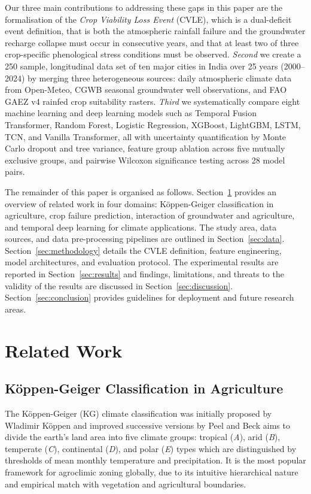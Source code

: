 \documentclass{ieeeaccess}
\begin{document}
Our three main contributions to addressing these gaps in this paper are the formalisation of the \textit{Crop Viability Loss Event} (CVLE), which is a dual-deficit event definition, that is both the atmospheric rainfall failure and the groundwater recharge collapse must occur in consecutive years, and that at least two of three crop-specific phenological stress conditions must be observed. \textit{Second} we create a 250 sample, longitudinal data set of ten major cities in India over 25 years (2000--2024) by merging three heterogeneous sources: daily atmospheric climate data from Open-Meteo, CGWB seasonal groundwater well observations, and FAO GAEZ v4 rainfed crop suitability rasters. \textit{Third} we systematically compare eight machine learning and deep learning models such as Temporal Fusion Transformer, Random Forest, Logistic Regression, XGBoost, LightGBM, LSTM, TCN, and Vanilla Transformer, all with uncertainty quantification by Monte Carlo dropout and tree variance, feature group ablation across five mutually exclusive groups, and pairwise Wilcoxon significance testing across 28 model pairs.

The remainder of this paper is organised as follows. Section~\ref{sec:related_work} provides an overview of related work in four domains: K\"{o}ppen-Geiger classification in agriculture, crop failure prediction, interaction of groundwater and agriculture, and temporal deep learning for climate applications. The study area, data sources, and data pre-processing pipelines are outlined in Section~\ref{sec:data}. Section~\ref{sec:methodology} details the CVLE definition, feature engineering, model architectures, and evaluation protocol. The experimental results are reported in Section~\ref{sec:results} and findings, limitations, and threats to the validity of the results are discussed in Section~\ref{sec:discussion}. Section~\ref{sec:conclusion} provides guidelines for deployment and future research areas.

\section{Related Work}
\label{sec:related_work}

\subsection{K\"{o}ppen-Geiger Classification in Agriculture}
The K\"{o}ppen-Geiger (KG) climate classification was initially proposed by Wladimir K\"{o}ppen and improved successive versions by Peel \cite{peel2007} and Beck \cite{beck2018} aims to divide the earth's land area into five climate groups: tropical (\textit{A}), arid (\textit{B}), temperate (\textit{C}), continental (\textit{D}), and polar (\textit{E}) types which are distinguished by thresholds of mean monthly temperature and precipitation. It is the most popular framework for agroclimic zoning globally, due to its intuitive hierarchical nature and empirical match with vegetation and agricultural boundaries.
\end{document}
